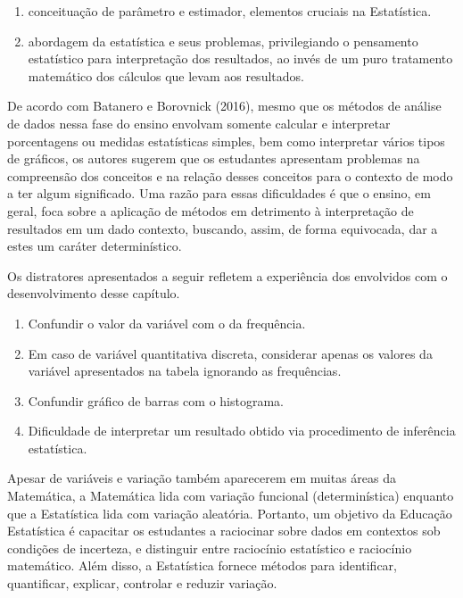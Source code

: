 \begin{apresentacao}
\begin{enumerate}
\item {} 
conceituação de parâmetro e estimador, elementos cruciais na Estatística.

\item {} 
abordagem da estatística e seus problemas, privilegiando o pensamento estatístico para interpretação dos resultados, ao invés de um puro tratamento matemático dos cálculos que levam aos resultados.

\end{enumerate}

De acordo com Batanero e Borovnick (2016), mesmo que os métodos de análise de dados nessa fase do ensino envolvam somente calcular e interpretar porcentagens  ou medidas estatísticas simples, bem como interpretar vários tipos de gráficos, os autores sugerem que os estudantes apresentam problemas na compreensão dos conceitos e na relação desses conceitos para o contexto de modo a ter algum significado. Uma razão para essas dificuldades é que o ensino, em geral, foca sobre a aplicação de métodos em detrimento à interpretação de resultados em um dado contexto, buscando, assim, de forma equivocada, dar a estes um caráter determinístico.

Os distratores apresentados a seguir refletem a experiência dos envolvidos com o desenvolvimento desse capítulo.
\begin{enumerate}
\item {} 
Confundir o valor da variável com o da frequência.

\item {} 
Em caso de variável quantitativa discreta, considerar apenas os valores da variável apresentados na tabela ignorando as frequências.

\item {} 
Confundir gráfico de barras com o histograma.

\item {} 
Dificuldade de interpretar um resultado obtido via procedimento de inferência estatística.

\end{enumerate}

Apesar de variáveis e variação também aparecerem em muitas áreas da Matemática, a Matemática lida com variação funcional (determinística) enquanto que a Estatística lida com variação aleatória. Portanto, um objetivo da Educação Estatística é capacitar os estudantes a raciocinar sobre dados em contextos sob condições de incerteza, e distinguir entre raciocínio estatístico e raciocínio matemático. Além disso, a Estatística fornece métodos para identificar, quantificar, explicar, controlar e reduzir variação.


\end{apresentacao}
